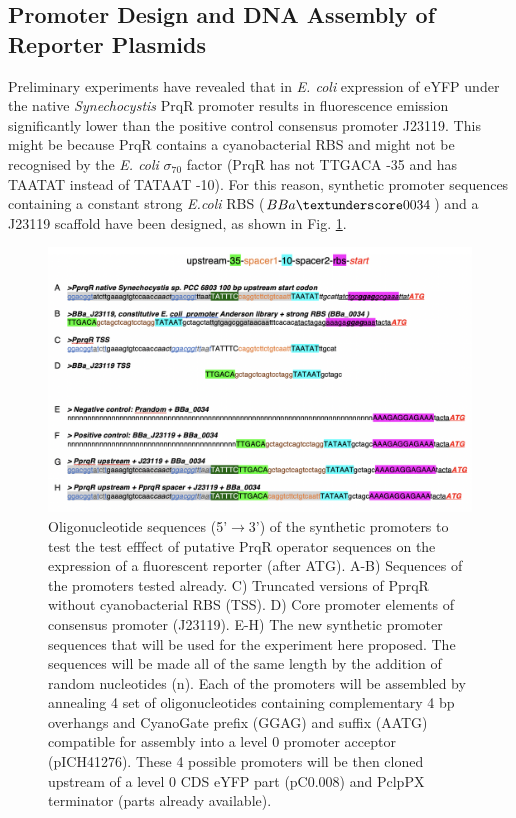 \subsection*{Promoter Design and DNA Assembly of Reporter Plasmids}
Preliminary experiments have revealed that in \textit{E. coli} expression of eYFP under the native \textit{Synechocystis} PrqR promoter results in fluorescence emission significantly lower than the positive control consensus promoter J23119. This might be because PrqR contains a cyanobacterial RBS and might not be recognised by the \textit{E. coli} $\sigma_{70}$ factor (PrqR has not TTGACA -35 and has TAATAT instead of TATAAT -10). For this reason,  synthetic promoter sequences containing a constant strong \textit{E.coli} RBS ($BBa\textunderscore0034$) and a J23119 scaffold have been designed, as shown in Fig. \ref{fig:promoters}.

\begin{figure}[H]
    \centering
    \includegraphics[width=\textwidth]{images/operator_promoters.png}
    \caption{Oligonucleotide sequences (5'$\rightarrow$3') of the synthetic promoters to test the test efffect of putative PrqR operator sequences on the expression of a fluorescent reporter (after ATG). A-B) Sequences of the promoters tested already. C) Truncated versions of PprqR without cyanobacterial RBS (TSS). D) Core promoter elements of consensus promoter (J23119). E-H) The new synthetic promoter sequences that will be used for the experiment here proposed. The sequences will be made all of the same length by the addition of random nucleotides (n). Each of the promoters will be assembled by annealing 4 set of oligonucleotides containing complementary 4 bp overhangs and CyanoGate prefix (GGAG) and suffix (AATG) compatible for assembly into a level 0 promoter acceptor (pICH41276).
These 4 possible promoters will be then cloned upstream of a level 0 CDS eYFP part (pC0.008) and PclpPX terminator (parts already available).}
    \label{fig:promoters}
\end{figure}

